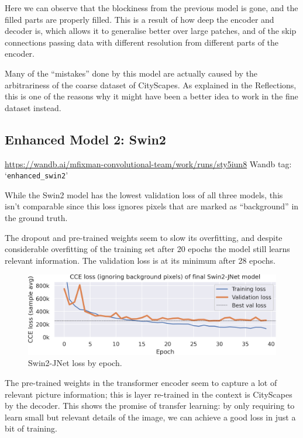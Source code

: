 Here we can observe that the blockiness from the previous model is gone, and the filled parts are properly filled.
This is a result of how deep the encoder and decoder is, which allows it to generalise better over large patches, and of the skip connections passing data with different resolution from different parts of the encoder.

Many of the ``mistakes'' done by this model are actually caused by the arbitrariness of the coarse dataset of CityScapes.
As explained in the Reflections, this is one of the reasons why it might have been a better idea to work in the fine dataset instead.

\newpage{}

\subsection{Enhanced Model 2: Swin2}
\begin{scriptsize}
	\vspace{-\parskip}
	\url{https://wandb.ai/mfixman-convolutional-team/work/runs/sty5iun8}
	\hfill{} Wandb tag: `\texttt{enhanced\_swin2}'
\end{scriptsize}

While the Swin2 model has the lowest validation loss of all three models, this isn't comparable since this loss ignores pixels that are marked as ``background'' in the ground truth.

The dropout and pre-trained weights seem to slow its overfitting, and despite considerable overfitting of the training set after 20 epochs the model still learns relevant information.
The validation loss is at its minimum after 28 epochs.

\begin{figure}[h]
	\centering
	\includegraphics[width=.9\textwidth]{swin2_loss.png}
	\caption{Swin2-JNet loss by epoch.}
\end{figure}

The pre-trained weights in the transformer encoder seem to capture a lot of relevant picture information; this is layer re-trained in the context is CityScapes by the decoder.
This shows the promise of transfer learning: by only requiring to learn small but relevant details of the image, we can achieve a good loss in just a bit of training.

